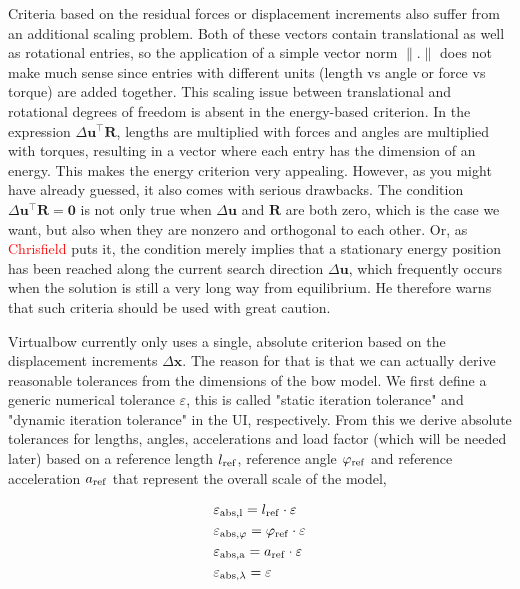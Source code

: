 Criteria based on the residual forces or displacement increments also suffer from an additional scaling problem.
Both of these vectors contain translational as well as rotational entries, so the application of a simple vector norm $\rVert.\rVert$ does not make much sense since entries with different units (length vs angle or force vs torque) are added together.
This scaling issue between translational and rotational degrees of freedom is absent in the energy-based criterion.
In the expression $\Delta\boldsymbol{u}^\intercal\boldsymbol{R}$, lengths are multiplied with forces and angles are multiplied with torques, resulting in a vector where each entry has the dimension of an energy.
This makes the energy criterion very appealing.
However, as you might have already guessed, it also comes with serious drawbacks.
The condition $\Delta\boldsymbol{u}^\intercal\boldsymbol{R} = \boldsymbol{0}$ is not only true when $\Delta\boldsymbol{u}$ and $\boldsymbol{R}$ are both zero, which is the case we want, but also when they are nonzero and orthogonal to each other.
Or, as \textcolor{red}{Chrisfield} puts it, the condition merely implies that a stationary energy position has been reached along the current search direction $\Delta\boldsymbol{u}$, which frequently occurs when the solution is still a very long way from equilibrium.
He therefore warns that such criteria should be used with great caution.

Virtualbow currently only uses a single, absolute criterion based on the displacement increments $\Delta\boldsymbol{x}$.
The reason for that is that we can actually derive reasonable tolerances from the dimensions of the bow model.
We first define a generic numerical tolerance $\varepsilon$, this is called "static iteration tolerance" and "dynamic iteration tolerance" in the UI, respectively.
From this we derive absolute tolerances for lengths, angles, accelerations and load factor (which will be needed later) based on a reference length $l_{\rm{ref}}$, reference angle $\varphi_{\rm{ref}}$ and reference acceleration $a_{\rm{ref}}$ that represent the overall scale of the model,

\begin{align}
&\varepsilon_{\rm{abs},l} = l_{\rm{ref}}\cdot\varepsilon \\
&\varepsilon_{\rm{abs},\varphi} = \varphi_{\rm{ref}}\cdot\varepsilon \\
&\varepsilon_{\rm{abs},a} = a_{\rm{ref}}\cdot\varepsilon \\
&\varepsilon_{\rm{abs},\lambda} = \varepsilon
\end{align}
 
